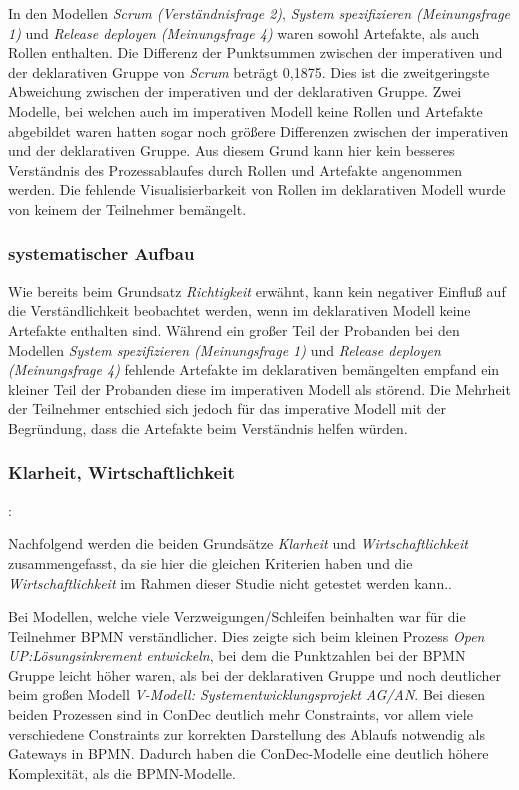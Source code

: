 In den Modellen \textit{Scrum (Verständnisfrage 2)}, \textit{System spezifizieren (Meinungsfrage 1)} und \textit{Release deployen (Meinungsfrage 4)} waren sowohl Artefakte, als auch Rollen enthalten. Die Differenz der Punktsummen zwischen der imperativen und der deklarativen Gruppe von \textit{Scrum} beträgt 0,1875. Dies ist die zweitgeringste Abweichung zwischen der imperativen und der deklarativen Gruppe. Zwei Modelle, bei welchen auch im imperativen Modell keine Rollen und Artefakte abgebildet waren hatten sogar noch größere Differenzen zwischen der imperativen und der deklarativen Gruppe. Aus diesem Grund kann hier kein besseres Verständnis des Prozessablaufes durch Rollen und Artefakte angenommen werden. \newline
Die fehlende Visualisierbarkeit von Rollen im deklarativen Modell wurde von keinem der Teilnehmer bemängelt.\newline



\subsubsection{systematischer Aufbau}

Wie bereits beim Grundsatz \textit{Richtigkeit} erwähnt, kann kein negativer Einfluß auf die Verständlichkeit beobachtet werden, wenn im deklarativen Modell keine Artefakte enthalten sind.\newline
Während ein großer Teil der Probanden bei den Modellen \textit{System spezifizieren (Meinungsfrage 1)} und \textit{Release deployen (Meinungsfrage 4)} fehlende Artefakte im deklarativen bemängelten empfand ein kleiner Teil der Probanden diese im imperativen Modell als störend. Die Mehrheit der Teilnehmer entschied sich jedoch für das imperative Modell mit der Begründung, dass die Artefakte beim Verständnis helfen würden. \subsubsection{Klarheit, Wirtschaftlichkeit}: 



Nachfolgend werden die beiden Grundsätze \textit{Klarheit} und \textit{Wirtschaftlichkeit} zusammengefasst, da sie hier die gleichen Kriterien haben und die \textit{Wirtschaftlichkeit} im Rahmen dieser Studie nicht getestet werden kann..\newline

Bei Modellen, welche viele Verzweigungen/Schleifen beinhalten war für die Teilnehmer BPMN verständlicher. Dies zeigte sich beim kleinen Prozess \textit{Open UP:Lösungsinkrement entwickeln}, bei dem die Punktzahlen bei der BPMN Gruppe leicht höher waren, als bei der deklarativen Gruppe und noch deutlicher beim großen Modell \textit{V-Modell: Systementwicklungsprojekt AG/AN}. Bei diesen beiden Prozessen sind in ConDec deutlich mehr Constraints, vor allem viele verschiedene Constraints zur korrekten Darstellung des Ablaufs notwendig als Gateways in BPMN. Dadurch haben die ConDec-Modelle eine deutlich höhere Komplexität, als die BPMN-Modelle.\newline

